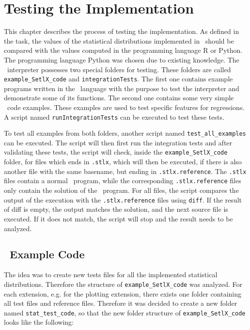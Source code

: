 
\chapter{Testing the Implementation}

	This chapter describes the process of testing the implementation. As defined in the task, the values of the statistical distributions implemented in \setlx\ should be compared with the values computed in the programming language R or Python. The programming language Python was chosen due to existing knowledge. The \setlx\ interpreter possesses two special folders for testing. These folders are called \lstinline{example_SetlX_code} and \lstinline{integrationTests}. The first one contains example programs written in the \setlx\ language with the purpose to test the interpreter and demonstrate some of its functions. The second one contains some very simple \setlx\ code examples. These examples are used to test specific features for regressions. A script named \lstinline{runIntegrationTests} can be executed to test these tests.

	To test all examples from both folders, another script named \lstinline{test_all_examples} can be executed. The script will then first run the integration tests and after validating these tests, the script will check, inside the \lstinline{example_SetlX_code} folder, for files which ends in \lstinline{.stlx}, which will then be executed, if there is also another file with the same basename, but ending in \lstinline{.stlx.reference}. The \lstinline{.stlx} files contain a normal \setlx\ program, while the corresponding \lstinline{.stlx.reference} files only contain the solution of the \setlx\ program. For all \setlx files, the script compares the output of the execution with the \lstinline{.stlx.reference} files using \lstinline{diff}. If the result of diff is empty, the output matches the solution, and the next source file is executed. If it does not match, the script will stop and the result needs to be analyzed.

	\section{\setlx\ Example Code}

	The idea was to create new tests files for all the implemented statistical distributions. Therefore the structure of \lstinline{example_SetlX_code} was analyzed. For each extension, e.g. for the plotting extension, there exists one folder containing all test files and reference files. Therefore it was decided to create a new folder named \lstinline{stat_test_code}, so that the new folder structure of \lstinline{example_SetlX_code} looks like the following:
	
